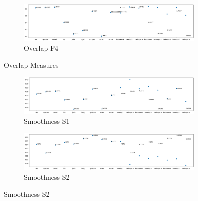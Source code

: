 \begin{figure}[h!]\ContinuedFloat
    \centering
    \begin{subfigure}{0.496\textwidth}
        \includegraphics[width=0.99\textwidth]{figures/overlap-F4.png}
        \caption{Overlap F4}
        \label{fig:overlap-f4}
    \end{subfigure}
    \caption{Overlap Measures}
    \label{fig:overlap}
\end{figure}

\begin{figure}[h!]
    \centering
    \begin{subfigure}{0.496\textwidth}
        \includegraphics[width=0.99\textwidth]{figures/smoothness-S1.png}
        \caption{Smoothness S1}
        \label{fig:smoothness-s1}
    \end{subfigure}
    \begin{subfigure}{0.496\textwidth}
        \includegraphics[width=0.99\textwidth]{figures/smoothness-S2.png}
        \caption{Smoothness S2}
        \label{fig:smoothness-s2}
    \end{subfigure}
\end{figure}
